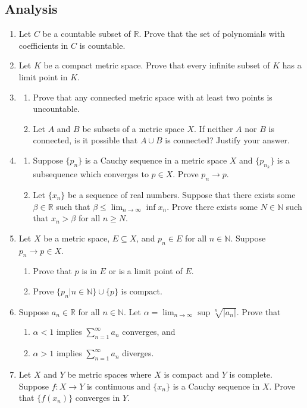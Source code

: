\documentclass{article}
\begin{document}
\subsection{Analysis}
\begin{enumerate}
    \item Let $C$ be a countable subset of $\mathbb{R}$. Prove that the set of polynomials with coefficients in $C$ is countable.
    \item Let $K$ be a compact metric space. Prove that every infinite subset of $K$ has a limit point in $K$.
    \item \begin{enumerate}
    \item Prove that any connected metric space with at least two points is uncountable.
    \item Let $A$ and $B$ be subsets of a metric space $X$. If neither $A$ nor $B$ is connected, is it possible that $A \cup B$ is connected? 
    Justify your answer.
    \end{enumerate}
    \item \begin{enumerate}
        \item Suppose $\{p_n\}$ is a Cauchy sequence in a metric space $X$ and $\{p_{n_k}\}$ is a subsequence which converges to $p \in X$.
        Prove $p_n \longrightarrow p$.
        \item Let $\{x_n\}$ be a sequence of real numbers. Suppose that there exists some $\beta \in \mathbb{R}$ such that $\beta \leq 
        \lim_{n \to \infty}{\inf{x_n}}$. Prove there exists some $N \in \mathbb{N}$ such that $x_n > \beta$ for all $n \geq N$.
    \end{enumerate}
    \item Let $X$ be a metric space, $E \subseteq X$, and $p_n \in E$ for all $n \in \mathbb{N}$. Suppose $p_n \longrightarrow p \in X$.
    \begin{enumerate}
        \item Prove that $p$ is in $E$ or is a limit point of $E$.
        \item Prove $\{p_n \big| n \in \mathbb{N}\} \cup \{p\}$ is compact.
    \end{enumerate}
    \item Suppose $a_n \in \mathbb{R}$ for all $n \in \mathbb{N}$. Let $\alpha = \lim_{n \to \infty}{\sup{\sqrt[n]{|a_n|}}}$. Prove that
    \begin{enumerate}
        \item $\alpha < 1$ implies $\sum_{n=1}^{\infty}{a_n}$ converges, and
        \item $\alpha > 1$ implies $\sum_{n=1}^{\infty}{a_n}$ diverges.
    \end{enumerate}
    \item Let $X$ and $Y$ be metric spaces where $X$ is compact and $Y$ is complete. Suppose $f: X \longrightarrow Y$ is continuous and
    $\{x_n\}$ is a Cauchy sequence in $X$. Prove that $\{f(x_n)\}$ converges in $Y$.
\end{enumerate}
\end{document}
